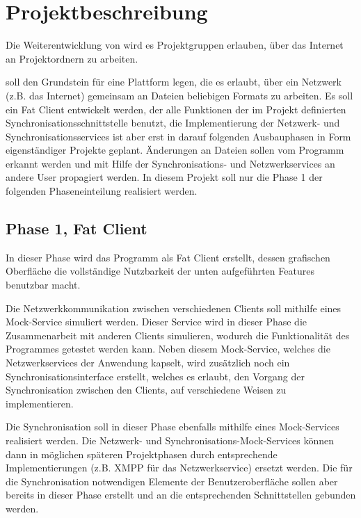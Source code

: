 
\section{Projektbeschreibung}
Die Weiterentwicklung von \sepmprojectname wird es Projektgruppen erlauben, über das Internet an Projektordnern zu arbeiten.

\sepmprojectname soll den Grundstein für eine Plattform legen, die es erlaubt, über ein Netzwerk (z.B. das Internet) gemeinsam an Dateien beliebigen Formats zu arbeiten. Es soll ein Fat Client entwickelt werden, der alle Funktionen der im Projekt definierten Synchronisationsschnittstelle benutzt, die Implementierung der Netzwerk- und Synchronisationsservices ist aber erst in darauf folgenden Ausbauphasen in Form eigenständiger Projekte geplant. Änderungen an Dateien sollen vom Programm erkannt werden und mit Hilfe der Synchronisations- und Netzwerkservices an andere User propagiert werden. In diesem Projekt soll nur die Phase 1 der folgenden Phaseneinteilung realisiert werden.

\subsection{Phase 1, Fat Client}
In dieser Phase wird das Programm als Fat Client erstellt, dessen grafischen Oberfläche die vollständige Nutzbarkeit der unten aufgeführten Features benutzbar macht. 

Die Netzwerkkommunikation zwischen verschiedenen Clients soll mithilfe eines Mock-Service simuliert werden. Dieser Service wird in dieser Phase die Zusammenarbeit mit anderen Clients simulieren, wodurch die Funktionalität des Programmes getestet werden kann. Neben diesem Mock-Service, welches die Netzwerkservices der Anwendung kapselt, wird zusätzlich noch ein Synchronisationsinterface erstellt, welches es erlaubt, den Vorgang der Synchronisation zwischen den Clients, auf verschiedene Weisen zu implementieren.

Die Synchronisation soll in dieser Phase ebenfalls mithilfe eines Mock-Services realisiert werden. Die Netzwerk- und Synchronisations-Mock-Services können dann in möglichen späteren Projektphasen durch entsprechende Implementierungen (z.B. XMPP für das Netzwerkservice) ersetzt werden. Die für die Synchronisation notwendigen Elemente der Benutzeroberfläche sollen aber bereits in dieser Phase erstellt und an die entsprechenden Schnittstellen gebunden werden. 

